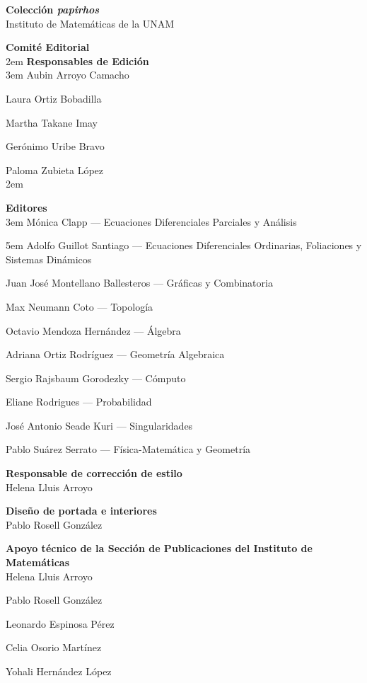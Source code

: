 \documentclass[10pt,pagesize]{scrbook}
\numberwithin{equation}{chapter}
\begin{document}
\small\parindent0pt\parskip0pt
\pagestyle{empty}
\textbf{Colección {\itshape papirhos}}\\[0pt]
Instituto de Matemáticas de la UNAM

\vfill

\textbf{Comité Editorial}\\[10pt]
\parindent2em
\indent
\textbf{Responsables de Edición}\\[3pt]
\parindent3em
\indent
Aubin Arroyo Camacho

Laura Ortiz Bobadilla

Martha Takane Imay

Gerónimo Uribe Bravo

Paloma Zubieta López\\[10pt]

\parindent2em

\textbf{Editores}\\[3pt]
\parindent3em
\indent
Mónica Clapp --- Ecuaciones Diferenciales Parciales y Análisis

\hangindent5em Adolfo Guillot Santiago --- Ecuaciones Diferenciales Ordinarias,
Foliaciones y\\ Sistemas Dinámicos

Juan José Montellano Ballesteros --- Gráficas y Combinatoria

Max Neumann Coto --- Topología

Octavio Mendoza Hernández --- Álgebra

Adriana Ortiz Rodríguez --- Geometría Algebraica

Sergio Rajsbaum Gorodezky --- Cómputo

Eliane Rodrigues --- Probabilidad

José Antonio Seade Kuri --- Singularidades

Pablo Suárez Serrato --- Física-Matemática y Geometría

\vfill

\parindent0pt

\textbf{Responsable de corrección de estilo}\\[0pt]
Helena Lluis Arroyo

\vfill

\textbf{Diseño de portada e interiores}\\[0pt]
Pablo Rosell González

\vfill

\textbf{Apoyo técnico de la Sección de Publicaciones del Instituto de Matemáticas}\\[0pt]
Helena Lluis Arroyo

Pablo Rosell González

Leonardo Espinosa Pérez

Celia Osorio Martínez

Yohali Hernández López
\end{document}
